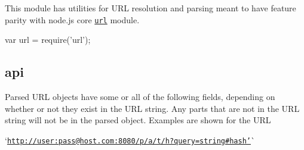 \href{https://travis-ci.org/defunctzombie/node-url}{\tt }

This module has utilities for U\+RL resolution and parsing meant to have feature parity with node.\+js core \href{http://nodejs.org/api/url.html}{\tt url} module.


\begin{DoxyCode}
var url = require('url');
\end{DoxyCode}


\subsection*{api}

Parsed U\+RL objects have some or all of the following fields, depending on whether or not they exist in the U\+RL string. Any parts that are not in the U\+RL string will not be in the parsed object. Examples are shown for the U\+RL

`\textquotesingle{}\href{http://user:pass@host.com:8080/p/a/t/h?query=string#hash&rsquo;}{\tt http\+://user\+:pass@host.\+com\+:8080/p/a/t/h?query=string\#hash'}\`{}


